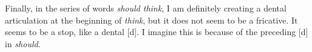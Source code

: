 \documentclass{article}
\newcommand{\lexi}[1]{\textit{#1}}
\begin{document}
\begin{enumerate}
\begin{itemize}
      Finally, in the series of words \lexi{should think}, I am definitely creating a dental articulation at the beginning of \lexi{think}, but it does not seem to be a fricative.
      It seems to be a stop, like a dental [d].
      I imagine this is because of the preceding [d] in \lexi{should}.
    \end{itemize}
  \end{enumerate}
\end{document}
